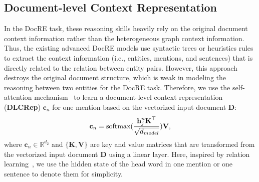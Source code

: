 \documentclass[11pt,a4paper]{article}
\begin{document}
\subsection{Document-level Context Representation}
\label{sec3-2}
In the DocRE task, these reasoning skills heavily rely on the original document context information rather than the heterogeneous graph context information.
Thus, the existing advanced DocRE models use syntactic trees or heuristics rules to extract the context information (i.e., entities, mentions, and sentences) that is directly related to the relation between entity pairs.
However, this approach destroys the original document structure, which is weak in modeling the reasoning between two entities for the DocRE task.
Therefore, we use the self-attention mechanism~\cite{NIPS2017_7181} to learn a document-level context representation (\textbf{DLCRep}) $\textbf{c}_n$ for one mention based on the vectorized input document $\textbf{D}$:
\begin{equation}
\textbf{c}_n=\textup{softmax}(\frac{\textbf{h}^{n}_j\textbf{K}^{\top}}{\sqrt{d_{model}}})\textbf{V},
\label{eq:Self-Attetion}
\end{equation}
where $\textbf{c}_n\in \mathbb{R}^{d_2}$ and $\{\textbf{K}, \textbf{V}\}$ are key and value matrices that are transformed from the vectorized input document $\textbf{D}$ using a linear layer.
Here, inspired by relation learning~\cite{match_blank}, we use the hidden state of the head word in one mention or one sentence to denote them for simplicity.
\end{document}
